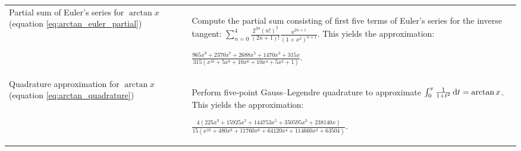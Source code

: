 \begin{table*}[ht]
\begin{tabular}{
        p{}
        p{}}
            Partial sum of Euler's series for $\arctan{x}$ (equation \ref{eq:arctan_euler_partial})
            & Compute the partial sum consisting of first five terms of Euler's series for the inverse tangent:
            $\sum_{n=0}^{4}
            {
            \frac
                {2^{2n}(n!)^2}
                {(2n+1)!}
            \frac
                {x^{2n+1}}
                {(1+x^2)^{n+1}}
            }$. This yields the approximation:
            \begin{center}
                $\displaystyle 
                \frac
                {965x^9 + 2370x^7 + 2688x^5 + 1470x^3 + 315x}
                {315\left(x^{10} + 5x^8 + 10x^6 + 10x^4 + 5x^2 + 1\right)}$.
            \end{center}
            \\[10pt]
            
            Quadrature approximation for $\arctan{x}$ (equation \ref{eq:arctan_quadrature})
            & Perform five-point Gauss--Legendre quadrature to approximate $\int_0^x{\frac{1}{1+t^2}\mathop{}\!\mathrm{d} t} = \arctan{x}$. This yields the approximation:
            \begin{center}
                $\displaystyle
            \frac
            {4\left(225x^9 + 15925x^7 + 144753x^5 + 350595x^3 + 238140x\right)}
            {15\left(x^{10} + 480x^8 + 11760x^6 + 64120x^4 + 114660x^2 + 63504\right)}$.
            \end{center}
            \\
	    \bottomrule
    \end{tabular}
\end{table*}